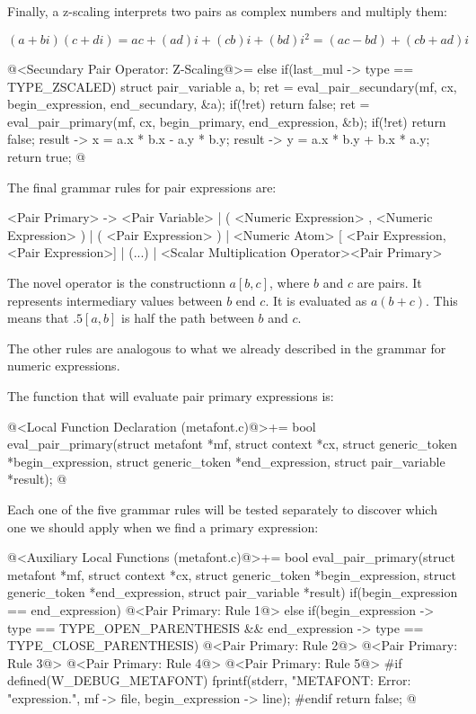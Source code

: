 Finally, a z-scaling interprets two pairs as complex numbers and
multiply them:

$$
(a+bi)(c+di) = ac + (ad)i + (cb)i + (bd)i^2 = (ac - bd) + (cb+ad)i
$$

\iniciocodigo
@<Secundary Pair Operator: Z-Scaling@>=
else if(last_mul -> type == TYPE_ZSCALED){
  struct pair_variable a, b;
  ret = eval_pair_secundary(mf, cx, begin_expression, end_secundary, &a);
  if(!ret)
    return false;
  ret = eval_pair_primary(mf, cx, begin_primary, end_expression, &b);
  if(!ret)
    return false;
  result -> x = a.x * b.x - a.y * b.y;
  result -> y = a.x * b.y + b.x * a.y;
  return true;
}
@
\fimcodigo


The final grammar rules for pair expressions are:

\alinhaverbatim
<Pair Primary> -> <Pair Variable> |
                  ( <Numeric Expression> , <Numeric Expression> ) |
                  ( <Pair Expression> ) |
                  <Numeric Atom> [ <Pair Expression, <Pair Expression>] |
                  (...) |
                  <Scalar Multiplication Operator><Pair Primary>
\alinhanormal

The novel operator is the constructionn $a[b, c]$, where $b$ and $c$
are pairs. It represents intermediary values between $b$ end $c$. It
is evaluated as $a(b+c)$. This means that $.5[a,b]$ is half the path
between $b$ and $c$.

The other rules are analogous to what we already described in the
grammar for numeric expressions.

The function that will evaluate pair primary expressions is:

\iniciocodigo
@<Local Function Declaration (metafont.c)@>+=
bool eval_pair_primary(struct metafont *mf, struct context *cx,
                       struct generic_token *begin_expression,
                       struct generic_token *end_expression,
                       struct pair_variable *result);
@
\fimcodigo

Each one of the five grammar rules will be tested separately to
discover which one we should apply when we find a primary expression:

\iniciocodigo
@<Auxiliary Local Functions (metafont.c)@>+=
bool eval_pair_primary(struct metafont *mf, struct context *cx,
                       struct generic_token *begin_expression,
                       struct generic_token *end_expression,
                       struct pair_variable *result){
  if(begin_expression == end_expression){
    @<Pair Primary: Rule 1@>
  }
  else if(begin_expression -> type == TYPE_OPEN_PARENTHESIS &&
          end_expression -> type == TYPE_CLOSE_PARENTHESIS){
    @<Pair Primary: Rule 2@>
    @<Pair Primary: Rule 3@>
  }
  @<Pair Primary: Rule 4@>
  @<Pair Primary: Rule 5@>
#if defined(W_DEBUG_METAFONT)
  fprintf(stderr, "METAFONT: Error: %
          "expression.",  mf -> file, begin_expression -> line);
#endif
  return false;
}
@

